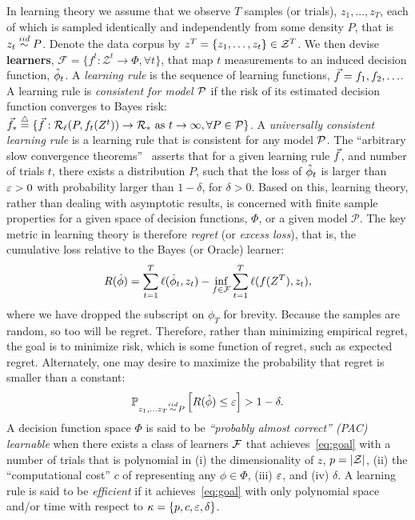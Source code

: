 \documentclass{article}
\begin{document}
In learning theory we assume that we observe $T$ samples (or trials), $z_1,\ldots, z_T$, each of which is sampled identically and independently from some density $P$, that is $z_t \overset{iid}{\sim} P$.  Denote the data corpus by $z^T =\{z_1,\ldots, z_t\} \in \mathcal{Z}^T$.  
We then devise  \textbf{learners}, $\mathcal{F} = \{f^t : \mathcal{Z}^t \to \Phi, \forall t\}$, that map $t$ measurements to an induced decision function, $\hat{\phi}_t$. 
A \emph{learning rule} is the sequence of learning functions, $\vec{f}= f_1,f_2,\ldots$.  A learning rule is \emph{consistent for model $\mathcal{P}$} if the risk of its estimated decision function converges to Bayes risk:
$\vec{f}_* \overset{\triangle}{=} \{ \vec{f} : \mathcal{R}_\ell(P,f_t(Z^t)) \to \mathcal{R}_* \text{ as } t \rightarrow \infty, \forall P \in \mathcal{P} \}$.
A \emph{universally consistent learning rule} is a learning rule that is consistent for any model $\mathcal{P}$. 
%
The ``arbitrary slow convergence theorems''~\cite{Devroye1993}  asserts that for a given learning rule $\vec{f}$, and number of trials $t$, there exists a distribution $P$, such that the loss of $\hat{\phi}_t$ is larger than $\varepsilon > 0$ with  probability larger than $1-\delta$, for $\delta>0$.   Based on this, learning theory, rather than dealing with asymptotic results, is concerned with finite sample properties for a given space of decision functions, $\Phi$, or a given model $\mathcal{P}$. 
The key metric in  learning theory is therefore \emph{regret} (or \emph{excess loss}), that is, the cumulative loss relative to the Bayes (or Oracle) learner:
\begin{align}
    R(\hat{\phi}) = \sum_{t=1}^T \ell(\hat{\phi}_t, z_t) - \inf_{f \in \mathcal{F}} \sum_{t=1}^T \ell ( f(Z^T), z_t),
\end{align}
where we have dropped the subscript on $\phi_T$ for brevity. 
Because the samples  are random, so too will be regret.  Therefore, rather than minimizing empirical regret, the goal is to minimize risk, which is some function of regret, such as expected regret. 
% 
Alternately, one may desire to maximize the probability that  regret is smaller than a constant:
\begin{align} \label{eq:goal}
    \mathbb{P}_{ z_1,\ldots z_T \overset{iid}{\sim} P} \left[R(\hat{\phi})  \leq \varepsilon \right] > 1 - \delta.
\end{align}
A decision function space $\Phi$ is said to be \emph{``probably almost correct'' (PAC) learnable} when there exists a class of learners $\mathcal{F}$ that achieves~\eqref{eq:goal} with a  number of trials that is polynomial in (i) the dimensionality of $z$, $p=|\mathcal{Z}|$, (ii) the ``computational cost'' $c$ of representing any $\phi \in \Phi$, (iii) $\varepsilon$, and  (iv) $\delta$.  A learning rule is said to be \emph{efficient} if it achieves~\eqref{eq:goal} with only polynomial space and/or time with respect to $\kappa= \{p,c,\varepsilon,\delta\}$.  
\end{document}

